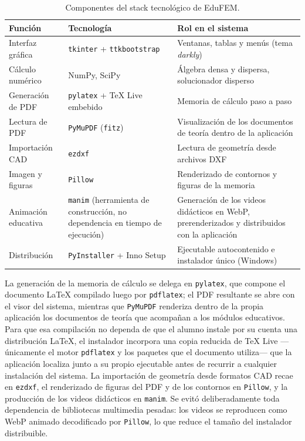 \begin{table}[H]
\centering
\caption{Componentes del stack tecnológico de EduFEM.}
\label{tab:stack}
\setlength{\tabcolsep}{4pt}
\begin{tabular}{@{}l >{\raggedright\arraybackslash}p{4.0cm} >{\raggedright\arraybackslash}p{6.9cm}@{}}
\toprule
\textbf{Función} & \textbf{Tecnología} & \textbf{Rol en el sistema} \\
\midrule
Interfaz gráfica      & \texttt{tkinter} + \texttt{ttkbootstrap} & Ventanas, tablas y menús (tema \emph{darkly}) \\
Cálculo numérico      & NumPy, SciPy                              & Álgebra densa y dispersa, solucionador disperso \\
Generación de PDF     & \texttt{pylatex} + \TeX{} Live embebido    & Memoria de cálculo paso a paso \\
Lectura de PDF        & \texttt{PyMuPDF} (\texttt{fitz})          & Visualización de los documentos de teoría dentro de la aplicación \\
Importación CAD       & \texttt{ezdxf}                            & Lectura de geometría desde archivos DXF \\
Imagen y figuras      & \texttt{Pillow}                           & Renderizado de contornos y figuras de la memoria \\
Animación educativa   & \texttt{manim} (herramienta de construcción, no dependencia en tiempo de ejecución) & Generación de los videos didácticos en WebP, prerenderizados y distribuidos con la aplicación \\
Distribución          & \texttt{PyInstaller} + Inno Setup         & Ejecutable autocontenido e instalador único (Windows) \\
\bottomrule
\end{tabular}
\end{table}

La generación de la memoria de cálculo se delega en \texttt{pylatex}, que compone el documento \LaTeX{} compilado luego por \texttt{pdflatex}; el PDF resultante se abre con el visor del sistema, mientras que \texttt{PyMuPDF} renderiza dentro de la propia aplicación los documentos de teoría que acompañan a los módulos educativos. Para que esa compilación no dependa de que el alumno instale por su cuenta una distribución \LaTeX{}, el instalador incorpora una copia reducida de \TeX{} Live —únicamente el motor \texttt{pdflatex} y los paquetes que el documento utiliza— que la aplicación localiza junto a su propio ejecutable antes de recurrir a cualquier instalación del sistema. La importación de geometría desde formatos CAD recae en \texttt{ezdxf}, el renderizado de figuras del PDF y de los contornos en \texttt{Pillow}, y la producción de los videos didácticos en \texttt{manim}. Se evitó deliberadamente toda dependencia de bibliotecas multimedia pesadas: los videos se reproducen como WebP animado decodificado por \texttt{Pillow}, lo que reduce el tamaño del instalador distribuible.

